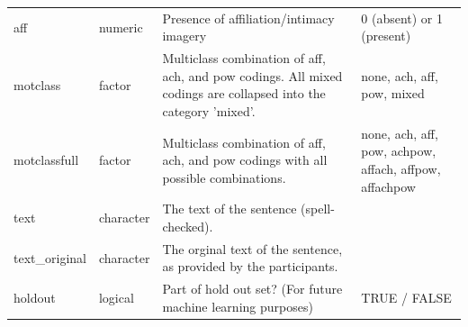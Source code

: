 \documentclass[man,a4paper,mask]{apa6}\usepackage[]{graphicx}\usepackage[]{color}
\begin{document}
\begin{table}
\begin{threeparttable}
\begin{tabularx}{\textwidth}{llXX}
  aff & numeric & Presence of affiliation/intimacy imagery & 0 (absent) or 1 (present) \\ 
  motclass & factor & Multiclass combination of aff, ach, and pow codings. All mixed codings are collapsed into the category 'mixed'. & none, ach, aff, pow, mixed \\ 
  motclassfull & factor & Multiclass combination of aff, ach, and pow codings with all possible combinations. & none, ach, aff, pow, achpow, affach, affpow, affachpow \\ 
  text & character & The text of the sentence (spell-checked). &  \\ 
  text\_original & character & The orginal text of the sentence, as provided by the participants. &  \\ 
  holdout & logical & Part of hold out set? (For future machine learning purposes) & TRUE / FALSE \\ 
   \hline

		\bottomrule
		\end{tabularx}
\end{threeparttable}
\end{table}
\end{document}
